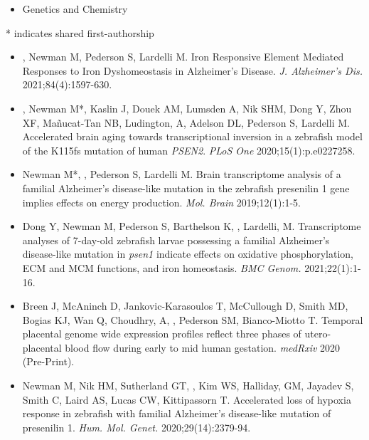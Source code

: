 \documentclass[10pt,a4paper,ragged2e,withhyper]{altacv2}
\begin{document}
\begin{paracol}{2}
\begin{itemize}
  \item {} Genetics and Chemistry
\end{itemize}



* indicates shared first-authorship
\medskip

\begin{itemize}
  \item {}, Newman M, Pederson S, Lardelli M. Iron Responsive Element Mediated Responses to Iron Dyshomeostasis in Alzheimer’s Disease. \textit{J. Alzheimer's Dis.} 2021;84(4):1597-630.
  \item {}, Newman M*, Kaslin J, Douek AM, Lumsden A, Nik SHM, Dong Y, Zhou XF, Mañucat-Tan NB, Ludington, A, Adelson DL, Pederson S, Lardelli M. Accelerated brain aging towards transcriptional inversion in a zebrafish model of the K115fs mutation of human \textit{PSEN2}. \textit{PLoS One} 2020;15(1):p.e0227258. 
  \item Newman M*, , Pederson S, Lardelli M. Brain transcriptome analysis of a familial Alzheimer’s disease-like mutation in the zebrafish presenilin 1 gene implies effects on energy production. \textit{Mol. Brain} 2019;12(1):1-5. 
  \item Dong Y, Newman M, Pederson S, Barthelson K, , Lardelli, M. Transcriptome analyses of 7-day-old zebrafish larvae possessing a familial Alzheimer’s disease-like mutation in \textit{psen1} indicate effects on oxidative phosphorylation, ECM and MCM functions, and iron homeostasis. \textit{BMC Genom.} 2021;22(1):1-16. 
  \item Breen J, McAninch D, Jankovic-Karasoulos T, McCullough D, Smith MD, Bogias KJ, Wan Q, Choudhry, A, , Pederson SM, Bianco-Miotto T. Temporal placental genome wide expression profiles reflect three phases of utero-placental blood flow during early to mid human gestation. \textit{medRxiv} 2020 (Pre-Print).
  \item Newman M, Nik HM, Sutherland GT, , Kim WS, Halliday, GM, Jayadev S, Smith C, Laird AS, Lucas CW,  Kittipassorn T. Accelerated loss of hypoxia response in zebrafish with familial Alzheimer’s disease-like mutation of presenilin 1. \textit{Hum. Mol. Genet.} 2020;29(14):2379-94.
\end{itemize}


\end{paracol}
\end{document}
